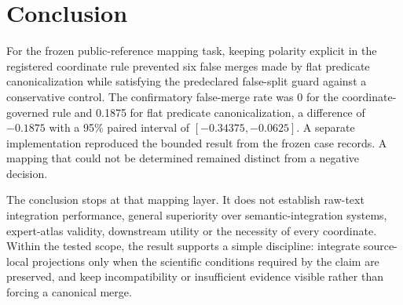 \section{Conclusion}
\label{sec:conclusion}

For the frozen public-reference mapping task, keeping polarity explicit in the
registered coordinate rule prevented six false merges made by flat predicate
canonicalization while satisfying the predeclared false-split guard against a
conservative control. The confirmatory false-merge rate was 0 for the
coordinate-governed rule and 0.1875 for flat predicate canonicalization, a
difference of $-0.1875$ with a 95\% paired interval of
$[-0.34375,-0.0625]$. A separate implementation reproduced the bounded result
from the frozen case records. A mapping that could not be determined remained
distinct from a negative decision.

The conclusion stops at that mapping layer. It does not establish raw-text
integration performance, general superiority over semantic-integration
systems, expert-atlas validity, downstream utility or the necessity of every
coordinate. Within the tested scope, the result supports a simple discipline:
integrate source-local projections only when the scientific conditions required
by the claim are preserved, and keep incompatibility or insufficient evidence
visible rather than forcing a canonical merge.
\endinput
